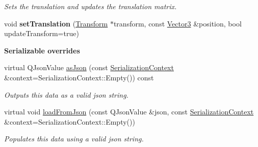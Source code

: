 \begin{Indent}
\begin{DoxyCompactItemize}
\begin{DoxyCompactList}\small\item\em Sets the translation and updates the translation matrix. \end{DoxyCompactList}\item 
\mbox{\label{classrev_1_1_translation_component_a4d8e0396c2b4ae9af7290a8f9aa94c50}} 
void {\bfseries set\+Translation} (\mbox{\hyperlink{classrev_1_1_transform}{Transform}} $\ast$transform, const \mbox{\hyperlink{classrev_1_1_vector}{Vector3}} \&position, bool update\+Transform=true)
\end{DoxyCompactItemize}
\end{Indent}
\begin{Indent}\textbf{ Serializable overrides}\par
\begin{DoxyCompactItemize}
\item 
\mbox{\label{classrev_1_1_translation_component_a78eb5ace43877654860ef31a4e8e67b0}} 
virtual Q\+Json\+Value \mbox{\hyperlink{classrev_1_1_translation_component_a78eb5ace43877654860ef31a4e8e67b0}{as\+Json}} (const \mbox{\hyperlink{structrev_1_1_serialization_context}{Serialization\+Context}} \&context=Serialization\+Context\+::\+Empty()) const
\begin{DoxyCompactList}\small\item\em Outputs this data as a valid json string. \end{DoxyCompactList}\item 
\mbox{\label{classrev_1_1_translation_component_a7d80852ed39078fc2b1208f4e4d7b5c6}} 
virtual void \mbox{\hyperlink{classrev_1_1_translation_component_a7d80852ed39078fc2b1208f4e4d7b5c6}{load\+From\+Json}} (const Q\+Json\+Value \&json, const \mbox{\hyperlink{structrev_1_1_serialization_context}{Serialization\+Context}} \&context=Serialization\+Context\+::\+Empty())
\begin{DoxyCompactList}\small\item\em Populates this data using a valid json string. \end{DoxyCompactList}\end{DoxyCompactItemize}
\end{Indent}
